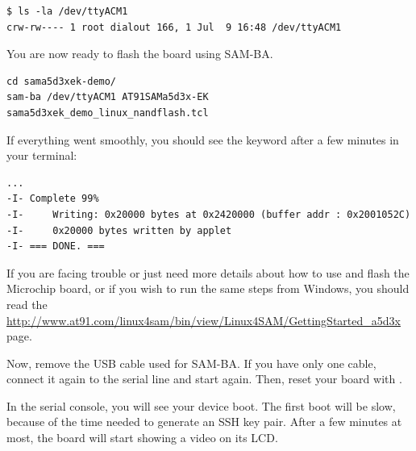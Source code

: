 \begin{verbatim}
$ ls -la /dev/ttyACM1
crw-rw---- 1 root dialout 166, 1 Jul  9 16:48 /dev/ttyACM1
\end{verbatim}

You are now ready to flash the board using SAM-BA.

\begin{verbatim}
cd sama5d3xek-demo/
sam-ba /dev/ttyACM1 AT91SAMa5d3x-EK sama5d3xek_demo_linux_nandflash.tcl
\end{verbatim}

If everything went smoothly, you should see the  keyword
after a few minutes in your terminal:

\begin{verbatim}
...
-I- Complete 99%
-I- 	Writing: 0x20000 bytes at 0x2420000 (buffer addr : 0x2001052C)
-I- 	0x20000 bytes written by applet
-I- === DONE. ===
\end{verbatim}

If you are facing trouble or just need more details about how to use and
flash the Microchip board, or if you wish to run the same steps from
Windows, you should read the
\url{http://www.at91.com/linux4sam/bin/view/Linux4SAM/GettingStarted_a5d3x}
page.

Now, remove the USB cable used for SAM-BA. If you have only one cable,
connect it again to the serial line and start  again.
Then, reset your board with .

In the serial console, you will see your device boot. The first boot
will be slow, because of the time needed to generate an SSH key pair.
After a few minutes at most, the board will start showing a video on
its LCD.
